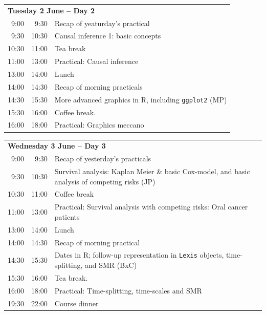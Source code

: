 \documentclass[a4paper, 12pt]{article}
\begin{document}
\noindent
\begin{tabular}{r@{ -- }rp{13cm}}
\multicolumn{3}{l}{\bf Tuesday 2 June -- Day 2} \\
9:00 & 9:30 & Recap of yeaturday's practical \\
9:30 & 10:30 & Causal inference 1: basic concepts\\ %
10:30 & 11:00 & Tea break\\
11:00 & 13:00 & Practical: Causal inference\\[1em] %
13:00 & 14:00 & Lunch \\
14:00 &  14:30 & Recap of morning practicals \\
14:30 & 15:30 & More advanced graphics in R, including
                \texttt{ggplot2} (MP)\\ %
15:30 & 16:00 & Coffee break. \\
16:00 & 18:00 & Practical: Graphics meccano \\[1em]%
\end{tabular}

\noindent
\begin{tabular}{r@{ -- }rp{13cm}}
\multicolumn{3}{l}{\bf Wednesday 3 June -- Day 3} \\
 9:00 &  9:30 & Recap of yesterday's practicals \\
 9:30 & 10:30 & Survival analysis: Kaplan Meier \& basic
                Cox-model, and basic analysis of competing risks (JP)\\ %
10:30 & 11:00 & Coffee break\\
11:00 & 13:00 & Practical: Survival analysis with competing risks: Oral cancer patients\\ %
13:00 & 14:00 & Lunch \\
14:00 & 14:30 & Recap of morning practical \\
14:30 & 15:30 & Dates in R; follow-up representation in \texttt{Lexis} objects,
                time-splitting,  and SMR (BxC)\\
15:30 & 16:00 & Tea break. \\
16:00 & 18:00 & Practical: Time-splitting, time-scales and SMR\\[1em] %
19:30 & 22:00 & Course dinner \\[1em]
\end{tabular}
\end{document}

